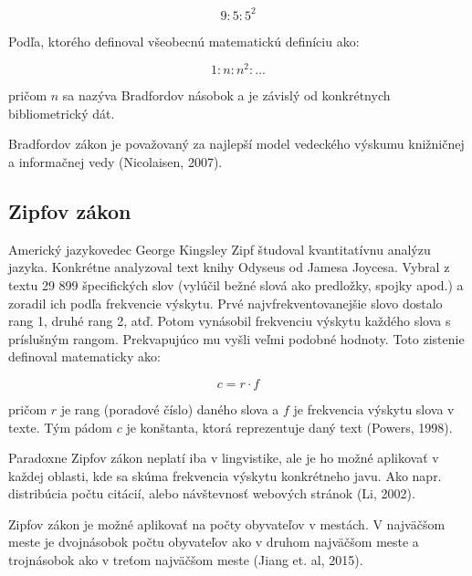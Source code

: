 \begin{equation}
\label{eq:bradfordov_zakon3}
9 : 5 : 5^2
\end{equation}

Podľa, ktorého definoval všeobecnú matematickú definíciu ako:

\begin{equation}
\label{eq:bradfordov_zakon4}
1 : n : n^2 : \dotso
\end{equation}

pričom $n$ sa nazýva Bradfordov násobok a je závislý od konkrétnych
bibliometrický dát.

Bradfordov zákon je považovaný za najlepší model vedeckého výskumu knižničnej a
informačnej vedy (Nicolaisen, 2007).


\subsection{Zipfov zákon}

Americký jazykovedec George Kingsley Zipf študoval kvantitatívnu analýzu jazyka.
Konkrétne analyzoval text knihy Odyseus od Jamesa Joycesa.  Vybral z textu 29
899 špecifických slov (vylúčil bežné slová ako predložky, spojky apod.)  a
zoradil ich podľa frekvencie výskytu.  Prvé najvfrekventovanejšie slovo dostalo
rang 1, druhé rang 2, atď.  Potom vynásobil frekvenciu výskytu každého slova s
príslušným rangom.  Prekvapujúco mu vyšli veľmi podobné hodnoty.  Toto zistenie
definoval matematicky ako:

\begin{equation}
\label{eq:zipfov_zakon}
c = r \cdot f
\end{equation}

pričom $r$ je rang (poradové číslo) daného slova a $f$ je frekvencia výskytu
slova v texte.  Tým pádom $c$ je konštanta, ktorá reprezentuje daný text
(Powers, 1998).


Paradoxne Zipfov zákon neplatí iba v lingvistike, ale je ho možné aplikovať v
každej oblasti, kde sa skúma frekvencia výskytu konkrétneho javu.  Ako
napr. distribúcia počtu citácií, alebo návštevnosť webových stránok (Li, 2002).

Zipfov zákon je možné aplikovať na počty obyvateľov v mestách.  V najväčšom
meste je dvojnásobok počtu obyvateľov ako v druhom najväčšom meste a trojnásobok
ako v treťom najväčšom meste (Jiang et. al, 2015).



